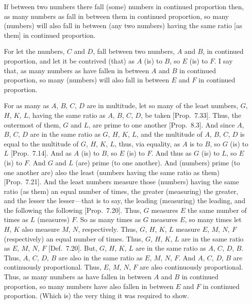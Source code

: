 \begin{Parallel}{}{}
{If between two numbers there fall (some) numbers in continued proportion then, as many  numbers as fall in between them in continued proportion, so many (numbers)  will also fall in between (any two numbers) having the same ratio [as them] in continued  proportion.

\epsfysize=2.2in
\centerline{}

For let the numbers, $C$ and $D$,
 fall between two numbers, $A$ and $B$, in continued proportion, and let it be contrived
(that) as $A$ (is) to $B$, so $E$ (is) to $F$. I say that, as many numbers  as have fallen in between $A$ and $B$ in continued proportion, so many (numbers)  will also fall in between $E$ and $F$ in continued proportion.

For as many  as $A$, $B$, $C$, $D$ are in multitude, let so many
of the least numbers, $G$, $H$, $K$, $L$, having the
same ratio as $A$, $B$, $C$, $D$, be taken [Prop.~7.33]. Thus, the outermost of them, $G$ and
$L$, are prime to one another [Prop.~8.3].
And since $A$, $B$, $C$, $D$ are in the same ratio as $G$, $H$, $K$, $L$,
and the multitude of $A$, $B$, $C$, $D$ is equal to the
multitude of $G$, $H$, $K$, $L$, thus, via equality, as $A$ is to $B$,
so $G$ (is) to $L$ [Prop.~7.14].
And as $A$ (is) to $B$, so $E$ (is) to $F$. And thus as $G$ (is) to $L$,
so $E$ (is) to $F$. And $G$ and $L$ (are) prime (to one another). And (numbers) prime (to one another are) also the least (numbers having the same ratio as them) [Prop.~7.21]. And the least numbers measure
those (numbers) having the same ratio (as them) an equal number of times, the greater (measuring) the greater, and the lesser the lesser---that is to say, the leading (measuring) the leading, and the following the following [Prop.~7.20]. Thus, $G$ measures $E$ the same
number of times as $L$ (measures) $F$. So as many times as $G$ measures $E$, so many times let $H$, $K$ also measure  $M$, $N$, respectively.
Thus, $G$, $H$, $K$, $L$  measure $E$, $M$, $N$, $F$ (respectively) an equal
number of times. Thus, $G$, $H$, $K$, $L$ are in the same
ratio as $E$, $M$, $N$, $F$ [Def.~7.20]. But,
$G$, $H$, $K$, $L$ are in the same ratio as $A$, $C$, $D$, $B$. 
Thus, $A$, $C$, $D$, $B$ are also in the same ratio as $E$, $M$, $N$, $F$.
And $A$, $C$, $D$, $B$ are continuously proportional. Thus, $E$, $M$, 
$N$, $F$  are also continuously proportional. Thus, as many numbers  as have fallen in between $A$ and $B$ in
continued proportion, so many
numbers  have also fallen in between $E$ and $F$ in continued proportion.
(Which is) the very thing it was required to show.}
\end{Parallel}

